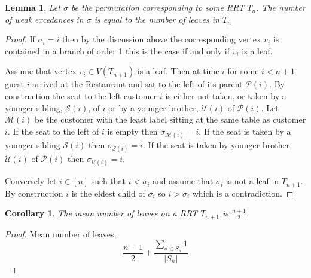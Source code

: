 \documentclass[oneside]{book} %
\newtheorem{lem}[thm]{Lemma}
\newtheorem{cor}[thm]{Corollary}
\theoremstyle{definition}
\numberwithin{equation}{section}
\begin{document}
\begin{lem}
 Let $\sigma$ be the permutation corresponding to some RRT $T_n$. The number of weak excedances in $\sigma$ is equal 
 to the number of leaves in $T_n$
\end{lem}
\begin{proof}
If $\sigma_i = i$ then by the discussion above the corresponding vertex $v_i$ is contained in a branch of order 1 this is the case if and only if $v_i$ is a leaf.  

Assume that vertex $v_{i} \in V(T_{n+1})$ is a leaf.  Then at time $i$ for some $i < n+1$ guest $i$ arrived at the Restaurant and sat to the left of its parent $\mathcal{P}(i)$.  By construction the seat to the left customer $i$ is either not taken, or taken by a younger sibling, $\mathcal{S}(i)$, of $i$ or by a younger brother, $\mathcal{U}(i)$ of $\mathcal{P}(i)$.  Let $\mathcal{M}(i)$ be the customer with the least label sitting at the same table as customer $i$.  If the seat to the left of $i$ is empty then $\sigma_{\mathcal{M}(i)} = i$.  If the seat is taken by a younger sibling $\mathcal{S}(i)$ then $\sigma_{\mathcal{S}(i)} = i$.  If the seat is taken by younger brother, $\mathcal{U}(i)$ of $\mathcal{P}(i)$ then $\sigma_{\mathcal{U}(i)} = i$.
 
 Conversely let $i \in [n]$ such that $i < \sigma_i$ and assume that $\sigma_i$ is not a leaf in $T_{n+1}$.  By construction $i$ is the eldest child of $\sigma_i$ so $i > \sigma_i$ which is a contradiction.    
\end{proof}

\begin{cor}
 The mean number of leaves on a RRT $T_{n+1}$ is $\frac{n+1}{2}$.
\end{cor}
\begin{proof}
 Mean number of leaves,
 \[
  \frac{n-1}{2} + \frac{\sum_{\sigma \in S_n} 1}{\lvert S_n \rvert} 
 \]
\end{proof}

 
\end{document}
